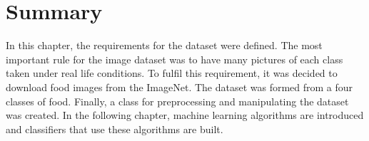 \section{Summary}
In this chapter, the requirements for the dataset were defined. The most important rule for the image dataset was to have many pictures of each class taken under real life conditions. To fulfil this requirement, it was decided to download food images from the ImageNet. The dataset was formed from a four classes of food. Finally, a class for preprocessing and manipulating the dataset was created.  In the following chapter, machine learning algorithms are introduced and classifiers that use these algorithms are built.